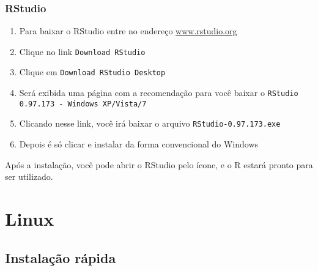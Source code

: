 \documentclass[a4paper,12pt]{article}\usepackage{graphicx, color}
\providecommand{\R}{\textsf{R}\xspace}
\providecommand{\RStudio}{\textsf{RStudio}\xspace}
\begin{document}
\subsubsection{\RStudio}

\begin{enumerate}
\item Para baixar o \RStudio entre no endereço
  \url{www.rstudio.org}
\item Clique no link \texttt{Download RStudio}
\item Clique em \texttt{Download RStudio Desktop}
\item Será exibida uma página com a recomendação para você baixar o
  \texttt{RStudio 0.97.173 - Windows XP/Vista/7}
\item Clicando nesse link, você irá baixar o arquivo
  \texttt{RStudio-0.97.173.exe}
\item Depois é só clicar e instalar da forma convencional do Windows
\end{enumerate}

Após a instalação, você pode abrir o \RStudio pelo ícone, e o \R estará
pronto para ser utilizado.

\section{Linux}

\subsection{Instalação rápida}
\label{sec:irl}
\end{document}
